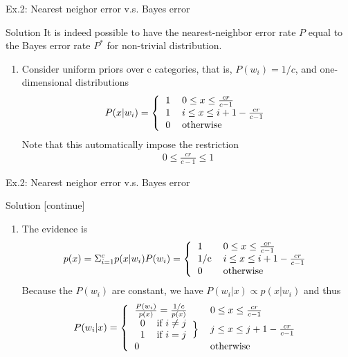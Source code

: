 \documentclass[compress,blue]{beamer}
\begin{document}
\begin{frame}{Ex.2: Nearest neighor error v.s. Bayes error}
	\begin{block}{Solution}
		It is indeed possible to have the nearest-neighbor error rate $P$ equal to the Bayes error rate $P^*$ for non-trivial distribution. 
		\begin{enumerate}
			\item Consider uniform priors over c categories, that is, $P(w_i) = 1/c$, and one-dimensional distributions
			\begin{align}
				P(x|w_i) = \left\{ 
				\begin{tabular}{ll}
				1 & $0\leq x\leq \frac{cr}{c-1}$ \\
				1 & $i\leq x \leq i + 1-\frac{cr}{c-1}$ \\
				0 & otherwise
				\end{tabular}
				\right.
			\end{align}
			Note that this automatically impose the restriction
			\begin{align}
				0 \leq \frac{cr}{c-1} \leq 1
			\end{align}
			
		\end{enumerate}
	\end{block}
\end{frame}

\begin{frame}{Ex.2: Nearest neighor error v.s. Bayes error}
	\begin{block}{Solution [continue]}
		\begin{enumerate}
			\item The evidence is 
			\begin{align}
				p(x) = \Sigma_{i=1}^c p(x|w_i)P(w_i) = \left\{ 
				\begin{tabular}{ll}
				1 & $0\leq x\leq \frac{cr}{c-1}$ \\
				1/c & $i\leq x \leq i + 1-\frac{cr}{c-1}$ \\
				0 & otherwise
				\end{tabular}
				\right.
			\end{align}
			Because the $P(w_i)$ are constant, we have $P(w_i|x) \propto p(x|w_i)$ and thus 
			\begin{align}
				P(w_i | x) = \left\{ 
				\begin{tabular}{ll}
				$\frac{P(w_i)}{p(x)} = \frac{1/c}{p(x)}$ & $0\leq x\leq \frac{cr}{c-1}$ \\
				\begin{tabular}{ll} 
				0 & if $i \neq j$ \\ 
				1 & if $ i = j $
				\end{tabular}\Big\} 
				&
				$j\leq x \leq j + 1-\frac{cr}{c-1}$ \\
				0 & otherwise
				\end{tabular}
				\right.
			\end{align}
		\end{enumerate}
	\end{block}
\end{frame}
\end{document}
